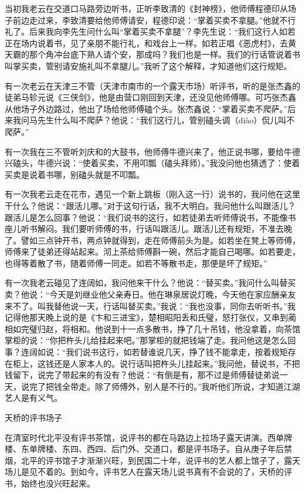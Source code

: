 \documentclass[12pt,UTF8]{ctexbook}
\begin{document}
当初我老云在交道口马路旁边听书，正听李致清的《封神榜》，他师傅程德印从场子前边走过来，李致清要给他师傅请安，程德印说：“掌着买卖不拿腿。”他就不行礼了。后来我向李先生问什么叫“掌着买卖不拿腿”？李先生说：“我们这行人如若正在场内说着书，见了亲朋不能行礼，和戏台上一样。如若正唱《恶虎村》，去黄天霸的那个角冲台底下熟人请个安，那成吗？我们也是一样。我们的行话管说着书叫掌买卖，管别请安施礼叫不拿腿儿。”我听了这个解释，才知道他们这行规矩。

有一次老云在天津三不管（天津市南市的一个露天市场）听评书，听的是张杰鑫的徒弟马轸元说《三侠剑》，他是由营口刚回到天津，还没见他师傅哪。可巧张杰鑫从他场子外边路过，他出了场给他师傅磕个头。张杰鑫说：“掌着买卖不爬萨。”后来我问马先生什么叫不爬萨？他说：“我们这行儿，管别磕头调（diào）侃儿叫不爬萨。”

有一次我在三不管听刘庆和的大鼓书，他师傅牛德兴来了，他正说书哪，要给牛德兴磕头，牛德兴说：“使着买卖，不用叩瓢（磕头拜师）。”我没问他也猜透了：使着买卖是说着书哪，别磕头就是不叩瓢。

有一次我老云走在花市，遇见一个新上跳板（刚入这一行）说书的，我问他在这里干什么？他说：“跟活儿哪。”对于这句行话，我不大明白。我问他什么叫跟活儿？跟活儿是怎么回事？他说：“我们说书的这行，如若徒弟去听师傅说书，不能像书座儿听书解闷。我们要听师傅的书，行话叫跟活儿。跟活儿还有规矩，不准去晚了。譬如三点钟开书，两点钟就得到，走在师傅前头为是。如若坐在凳上等师傅，师傅来了徒弟还得站起来。沏上茶给师傅斟一碗，然后才能自己喝哪。如若要走，也得等着散了书，随着师傅一同走。如若不等散书走，那便是坏了规矩。”

有一次我老云碰见了连阔如，我问他来干什么？他说：“替买卖。”我问什么叫替买卖？他说：“今天是刘继业他父亲寿日。他在琳泉居说灯晚，今天他在家应酬亲友来不了。叫我替他说一天，行话叫替买卖。”我说：“我也没事，同你去听听书。”我记得他那天晚上说的是《卞和三进宝》，楚相昭阳丢和氏璧，怒打张仪，又串到蔺相如完璧归赵，将相和。他说到十一点多散书，挣了几十吊钱，他没拿着，向茶馆掌柜的说：“你把杵头儿给挂起来吧。”那掌柜的就把钱端了走。我问他这是怎么回事？连阔如说：“我们说书这行，如若替谁说几天，挣了钱不能拿走，按着规矩存在柜上，这钱还是人家本人的。说行话叫把杵头儿挂起来。”我问他，替说书，不把钱留下，说完了带起来的有没有？他说：“有倒是有，那不过是师傅替徒弟说一天，说完了把钱全带走。除了师傅外，别人是不行的。”我听他们所说，才知道江湖艺人是有义气。





天桥的评书场子


在清室时代北平没有评书茶馆，说评书的都在马路边上拉场子露天讲演。西单牌楼、东单牌楼、东四、西四、后门外、交道口，都是评书场子。自从庚子年后禁烟，北平的评书馆子才渐渐兴旺，到民国二十年，说评书的艺人都上馆子了，露天场儿是见不着的。到如今，评书艺人在露天场儿说书真有不会说的了，天桥的评书，始终也没兴旺起来。
\end{document}
